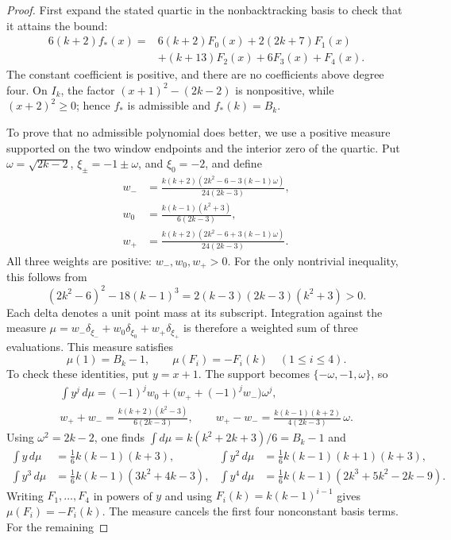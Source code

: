 \documentclass[a4paper,10pt,reqno]{amsart}
\theoremstyle{plain}
\theoremstyle{definition}
\theoremstyle{remark}
\begin{document}
\begin{proof}
First expand the stated quartic in the nonbacktracking basis to check
that it attains the bound:
\[
\begin{aligned}
6(k+2)f_*(x)={}&6(k+2)F_0(x)+2(2k+7)F_1(x)\\
&+(k+13)F_2(x)+6F_3(x)+F_4(x).
\end{aligned}
\]
The constant coefficient is positive, and there are no coefficients above
degree four.  On \(I_k\), the factor \((x+1)^2-(2k-2)\) is nonpositive, while
\((x+2)^2\ge0\); hence \(f_*\) is admissible and \(f_*(k)=B_k\).

To prove that no admissible polynomial does better, we use a positive
measure supported on the two window endpoints and the interior zero of the
quartic.  Put \(\omega=\sqrt{2k-2}\),
\(\xi_\pm=-1\pm\omega\), and \(\xi_0=-2\), and define
\begin{align*}
w_-&=\frac{k(k+2)(2k^2-6-3(k-1)\omega)}{24(2k-3)},\\
w_0&=\frac{k(k-1)(k^2+3)}{6(2k-3)},\\
w_+&=\frac{k(k+2)(2k^2-6+3(k-1)\omega)}{24(2k-3)}.
\end{align*}
All three weights are positive: \(w_-,w_0,w_+>0\).  For the only
nontrivial inequality, this follows from
\[
 (2k^2-6)^2-18(k-1)^3
 =2(k-3)(2k-3)(k^2+3)>0.
\]
Each delta denotes a unit point mass at its subscript. Integration against
the measure
\(\mu=w_-\delta_{\xi_-}+w_0\delta_{\xi_0}+w_+\delta_{\xi_+}\) is therefore
a weighted sum of three evaluations. This measure satisfies
\[
 \mu(1)=B_k-1,
 \qquad \mu(F_i)=-F_i(k)\quad(1\le i\le4).
\]
To check these identities, put \(y=x+1\). The support becomes
\(\{-\omega,-1,\omega\}\), so
\[
\begin{gathered}
 \int y^j\,d\mu=(-1)^jw_0+\bigl(w_++(-1)^jw_-\bigr)\omega^j,\\
 w_++w_-=\frac{k(k+2)(k^2-3)}{6(2k-3)},\qquad
 w_+-w_-=\frac{k(k-1)(k+2)}{4(2k-3)}\,\omega.
\end{gathered}
\]
Using \(\omega^2=2k-2\), one finds \(\int d\mu=k(k^2+2k+3)/6=B_k-1\) and
\[
\begin{aligned}
 \int y\,d\mu&=\tfrac16k(k-1)(k+3), &
 \int y^2\,d\mu&=\tfrac16k(k-1)(k+1)(k+3),\\
 \int y^3\,d\mu&=\tfrac16k(k-1)(3k^2+4k-3), &
 \int y^4\,d\mu&=\tfrac16k(k-1)(2k^3+5k^2-2k-9).
\end{aligned}
\]
Writing \(F_1,\dots,F_4\) in powers of \(y\) and using \(F_i(k)=k(k-1)^{i-1}\)
gives \(\mu(F_i)=-F_i(k)\).
The measure cancels the first four nonconstant basis terms. For the remaining

\end{proof}
\end{document}
